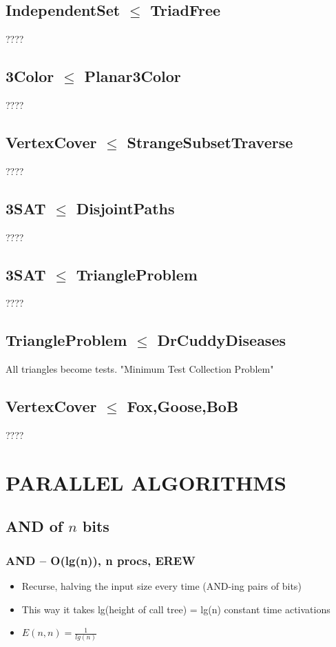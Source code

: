 \documentclass[12pt]{article}
\providecommand{\tightlist}{
    \setlength{\itemsep}{0pt}\setlength{\parskip}{0pt}
}
\providecommand{\reducible}[2]{
  \textbf{#1} $\leq$ \textbf{#2}
}
\begin{document}
\subsection{\reducible{IndependentSet}{TriadFree}}
????


\subsection{\reducible{3Color}{Planar3Color}}
????


\subsection{\reducible{VertexCover}{StrangeSubsetTraverse}}
????


\subsection{\reducible{3SAT}{DisjointPaths}}
????


\subsection{\reducible{3SAT}{TriangleProblem}}
????



\subsection{\reducible{TriangleProblem}{DrCuddyDiseases}}
All triangles become tests.
"Minimum Test Collection Problem"


\subsection{\reducible{VertexCover}{Fox,Goose,BoB}}
????





\section{PARALLEL ALGORITHMS}
\subsection{AND of $n$ bits}
\subsubsection{AND -- O(lg(n)), n procs, EREW}
\begin{itemize}\tightlist
  \item Recurse, halving the input size every time (AND-ing pairs of bits)
  \item This way it takes lg(height of call tree) = lg(n) constant time activations
  \item $E(n,n) = \frac{1}{lg(n)}$
\end{itemize}
\end{document}
